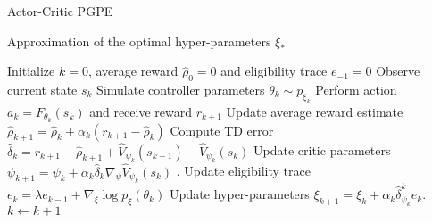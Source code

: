 \begin{algorithm}[t!]
	\caption{Actor-Critic PGPE}
	\label{algo:ACPGPE}
	\begin{algorithmic}[0]
			\Ensure Approximation of the optimal hyper-parameters $\xi_*$
			\begin{algorithmic}[1]
			\State Initialize $k = 0$, average reward $\widehat{\rho}_0 = 0$ and eligibility trace $e_{-1} = 0$
			\Repeat
				\State Observe current state $s_k$
				\State Simulate controller parameters $\theta_k \sim p_{\xi_k}$
				\State Perform action $a_k = F_{\theta_k}(s_k)$ and receive reward $r_{k+1}$
				\State Update average reward estimate $\widehat{\rho}_{k+1} = \widehat{\rho}_{k} + \alpha_k (r_{k+1} - \widehat{\rho}_{k})$
				\State Compute TD error $\widehat{\delta}_k = r_{k+1} - \widehat{\rho}_{k+1} + \widehat{V}_{\psi_k}(s_{k+1}) - \widehat{V}_{\psi_k}(s_k)$
				\State Update critic parameters $	\psi_{k+1} = \psi_k + \alpha_k \widehat{\delta}_k \nabla_\psi \widehat{V}_{\psi_k}(s_k)$ . 
				\State Update eligibility trace $e_k = \lambda e_{k-1} + \nabla_\xi\log p_\xi(\theta_k)$
				\State Update hyper-parameters $\xi_{k+1} = \xi_k + \alpha_k \widehat{\delta}_{\psi_k}^k e_k $. 
				\State $k \leftarrow k + 1$
		\end{algorithmic}
	\end{algorithmic}
\end{algorithm}  

